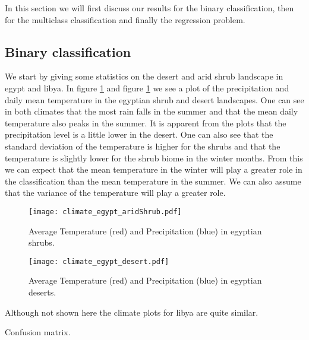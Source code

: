 In this section we will first discuss our results for the binary classification, then for the multiclass classification
and finally the regression problem.

\subsection{Binary classification}

We start by giving some statistics on the desert and arid shrub landscape in egypt and libya.
In figure \ref{pl:climate:egypt:aridShrub} and figure \ref{pl:climate:egypt:aridShrub}
we see a plot of the precipitation and daily mean temperature in the egyptian shrub and desert landscapes.
One can see in both climates that the most rain falls in the summer and that the mean daily temperature also peaks in the summer.
It is apparent from the plots that the precipitation level is a little lower in the desert.
One can also see that the standard deviation of the temperature is higher for the shrubs and that the
temperature is slightly lower for the shrub biome in the winter months.
From this we can expect that the mean temperature in the winter will play a greater role in the classification
than the mean temperature in the summer. We can also assume that the variance of the temperature will play a greater role.
\begin{figure}[h]
  \centering
  \begin{minipage}{0.45\textwidth}
    \centering
    \texttt{[image: climate\_egypt\_aridShrub.pdf]}
    \caption{Average Temperature (red) and Precipitation (blue) in egyptian shrubs.}
    \label{pl:climate:egypt:aridShrub}
  \end{minipage}
  \hfill
  \begin{minipage}{0.45\textwidth}
    \centering
    \texttt{[image: climate\_egypt\_desert.pdf]}
    \caption{Average Temperature (red) and Precipitation (blue) in egyptian deserts.}
    \label{pl:climate:egypt:aridShrub}
  \end{minipage}
\end{figure}
Although not shown here the climate plots for libya are quite similar.



\begin{table}[h]
  \centering
  
  \caption{Confusion matrix.}
\end{table}


